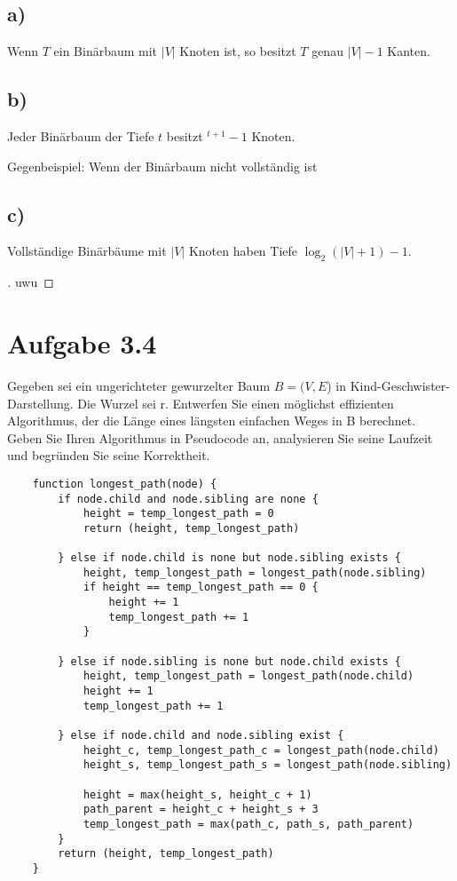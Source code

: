 \documentclass[a4paper]{article}
\begin{document}
\subsection*{a)}
Wenn $T$ ein Binärbaum mit $\left|V\right|$ Knoten ist, so besitzt $T$ genau $\left|V\right| - 1$ Kanten.

\subsection*{b)}
Jeder Binärbaum der Tiefe $t$ besitzt $^{t+1} - 1$ Knoten.

Gegenbeispiel: Wenn der Binärbaum nicht vollständig ist


\subsection*{c)}
Vollständige Binärbäume mit $\left|V\right|$ Knoten haben Tiefe $\log_2(\left|V\right| + 1) - 1$.

\begin{proof}[\unskip\nopunct]
uwu
\end{proof}

\break

\section*{Aufgabe 3.4}
Gegeben sei ein ungerichteter gewurzelter Baum $B = (V, E$) in Kind-Geschwister-Darstellung. Die Wurzel sei r.
Entwerfen Sie einen möglichst effizienten Algorithmus, der die Länge eines längsten einfachen Weges in B berechnet. Geben Sie Ihren Algorithmus in Pseudocode an, analysieren Sie seine Laufzeit und begründen Sie seine Korrektheit.


\begin{verbatim}
    function longest_path(node) {
        if node.child and node.sibling are none {
            height = temp_longest_path = 0
            return (height, temp_longest_path)

        } else if node.child is none but node.sibling exists {
            height, temp_longest_path = longest_path(node.sibling)
            if height == temp_longest_path == 0 {
                height += 1
                temp_longest_path += 1
            }

        } else if node.sibling is none but node.child exists {
            height, temp_longest_path = longest_path(node.child)
            height += 1
            temp_longest_path += 1

        } else if node.child and node.sibling exist {
            height_c, temp_longest_path_c = longest_path(node.child)
            height_s, temp_longest_path_s = longest_path(node.sibling)

            height = max(height_s, height_c + 1)
            path_parent = height_c + height_s + 3
            temp_longest_path = max(path_c, path_s, path_parent)
        }
        return (height, temp_longest_path)
    }
\end{verbatim}
\end{document}
